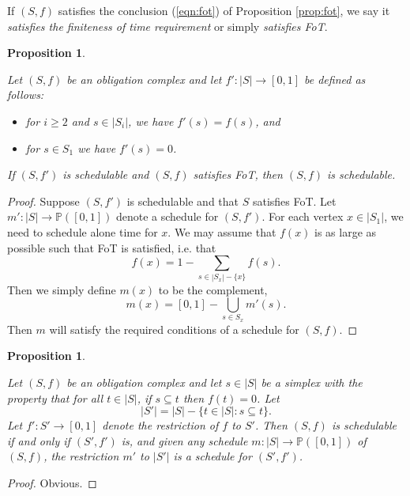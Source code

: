 \documentclass{amsart}
\def\PP{{\mathbb P}}
\def\to{\rightarrow}
\def\taking{\colon}
\def\ss{\subseteq}
\newtheorem{proposition}[theorem]{Proposition}
\theoremstyle{remark}
\theoremstyle{definition}
\begin{document}
If $(S,f)$ satisfies  the conclusion (\ref{eqn:fot}) of Proposition \ref{prop:fot}, we say it {\em satisfies the finiteness of time requirement} or simply {\em satisfies FoT}.

\begin{proposition}\label{prop:alone}

Let $(S,f)$ be an obligation complex and let $f'\taking|S|\to[0,1]$ be defined as follows: \begin{itemize}\item for $i\geq 2$ and $s\in |S_i|$, we have $f'(s)=f(s)$, and\item for $s\in S_1$ we have $f'(s)=0$.\end{itemize} If $(S,f')$ is schedulable and $(S,f)$ satisfies FoT, then $(S,f)$ is schedulable.

\end{proposition}

\begin{proof}

Suppose $(S,f')$ is schedulable and that $S$ satisfies FoT. Let $m'\taking|S|\to\PP([0,1])$ denote a schedule for $(S,f')$. For each vertex $x\in|S_1|$, we need to schedule alone time for $x$. We may assume that $f(x)$ is as large as possible such that FoT is satisfied, i.e. that $$f(x)=1-\sum_{s\in |S_x|-\{x\}} f(s).$$ Then we simply define $m(x)$ to be the complement, $$m(x)=[0,1]-\bigcup_{s\in S_x}m'(s).$$ Then $m$ will satisfy the required conditions of a schedule for $(S,f)$.

\end{proof}

\begin{proposition}\label{prop:removing unobligated simplices}

Let $(S,f)$ be an obligation complex and let $s\in|S|$ be a simplex with the property that for all $t\in|S|$, if $s\ss t$ then $f(t)=0$. Let $$|S'|=|S|-\{t\in|S| : s\ss t\}.$$ Let $f'\taking S'\to[0,1]$ denote the restriction of $f$ to $S'$. Then $(S,f)$ is schedulable if and only if $(S',f')$ is, and given any schedule $m\taking|S|\to\PP([0,1])$ of $(S,f)$, the restriction $m'$ to $|S'|$ is a schedule for $(S',f')$.

\end{proposition}

\begin{proof}

Obvious.

\end{proof}
\end{document}

